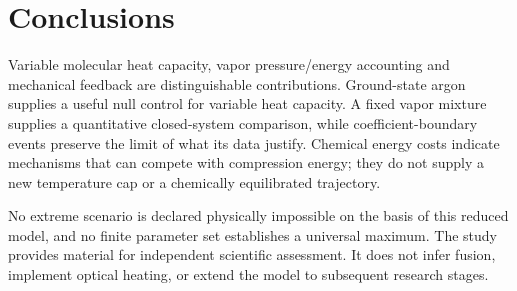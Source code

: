 \documentclass[10pt,a4paper]{article}
\begin{document}
\section{Conclusions}
Variable molecular heat capacity, vapor pressure/energy accounting and mechanical feedback are distinguishable contributions. Ground-state argon supplies a useful null control for variable heat capacity. A fixed vapor mixture supplies a quantitative closed-system comparison, while coefficient-boundary events preserve the limit of what its data justify. Chemical energy costs indicate mechanisms that can compete with compression energy; they do not supply a new temperature cap or a chemically equilibrated trajectory.

No extreme scenario is declared physically impossible on the basis of this reduced model, and no finite parameter set establishes a universal maximum. The study provides material for independent scientific assessment. It does not infer fusion, implement optical heating, or extend the model to subsequent research stages.
\end{document}
